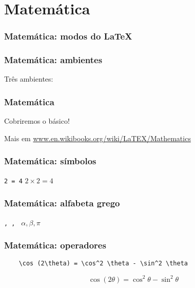 \section{Matemática}

\begin{frame}
  \frametitle{Matemática: modos do \LaTeX}
  \LARGE
\end{frame}

\begin{frame}[fragile]
  \frametitle{Matemática: ambientes}
  \LARGE
  Três ambientes:\\

\end{frame}

\begin{frame}
  \frametitle{Matemática}
  \LARGE
  Cobriremos o básico!

  Mais em \url{www.en.wikibooks.org/wiki/LaTEX/Mathematics}
\end{frame}

\begin{frame}[fragile]
  \frametitle{Matemática: símbolos}
  \LARGE
  \texttt{2  = 4}
  \hfill
  \( 2 \times 2 = 4 \)
\end{frame}

\begin{frame}[fragile]
  \frametitle{Matemática: alfabeta grego}
  \LARGE
  \texttt{\alpha, \beta, \pi}
  \hfill
  \( \alpha, \beta, \pi \)
\end{frame}

\begin{frame}[fragile]
  \frametitle{Matemática: operadores}
  \begin{verbatim}
    \cos (2\theta) = \cos^2 \theta - \sin^2 \theta
  \end{verbatim}

  \LARGE
  \[ \cos (2\theta) = \cos^2 \theta - \sin^2 \theta \]
\end{frame}

